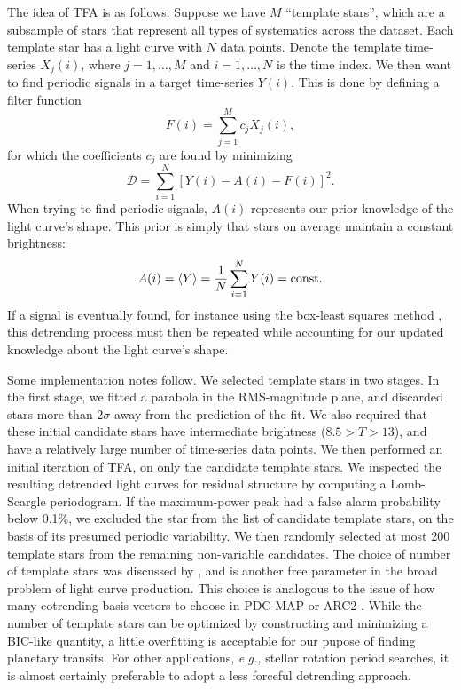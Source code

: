 \documentclass[12pt,twocolumn,tighten]{aastex62}
\begin{document}
The idea of TFA is as follows.  Suppose we have $M$ ``template
stars'', which are a subsample of stars that represent all types of
systematics across the dataset.  Each template star has a light curve
with $N$ data points.  Denote the template time-series $X_j(i)$, where
$j={1,\ldots,M}$ and $i={1,\ldots,N}$ is the time index.  We then want
to find periodic signals in a target time-series $Y(i)$.  This is done
by defining a filter function
\begin{equation}
  F(i) = \sum_{j=1}^{M} c_j X_j(i),
\end{equation}
for which the coefficients $c_j$ are found by minimizing
\begin{equation}
  \mathcal{D} = \sum_{i=1}^{N} \left[ Y(i) - A(i) - F(i) \right]^2.
  \label{eq:tfa_to_minimize}
\end{equation}
When trying to find periodic signals, $A(i)$ represents our prior
knowledge of the light curve's shape.  This prior is simply that stars
on average maintain a constant brightness:
\begin{equation}
  A(i) = \langle Y \rangle = \frac{1}{N} \sum_{i=1}^{N} Y(i) = {\rm const.}
\end{equation}
If a signal is eventually found, for instance using the box-least
squares method \citep{kovacs_box-fitting_2002}, this detrending
process must then be repeated while accounting for our updated
knowledge about the light curve's shape.

Some implementation notes follow.  We selected template stars in two
stages.  In the first stage, we fitted a parabola in the RMS-magnitude
plane, and discarded stars more than $2\sigma$ away from the
prediction of the fit.  We also required that these initial candidate
stars have intermediate brightness ($8.5 > T > 13$), and have a
relatively large number of time-series data points.  We then performed
an initial iteration of TFA, on only the candidate template stars.  We
inspected the resulting detrended light curves for residual structure
by computing a Lomb-Scargle periodogram.  If the maximum-power peak
had a false alarm probability below 0.1\%, we excluded the star from
the list of candidate template stars, on the basis of its presumed
periodic variability.  We then randomly selected at most 200 template
stars from the remaining non-variable candidates.  The choice of
number of template stars was discussed by \citet{kovacs_trend_2005},
and is another free parameter in the broad problem of light curve
production.  This choice is analogous to the issue of how many
cotrending basis vectors to choose in PDC-MAP or ARC2
\citep{aigrain_robust_2017}.  While the number of template stars can
be optimized by constructing and minimizing a BIC-like quantity, a
little overfitting is acceptable for our pupose of finding planetary
transits.  For other applications, {\it e.g.,} stellar rotation period
searches, it is almost certainly preferable to adopt a less forceful
detrending approach.
\end{document}
